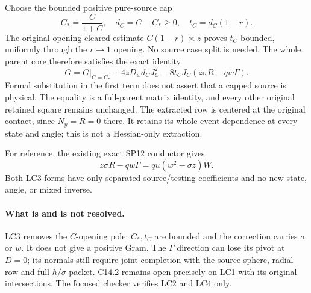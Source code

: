 Choose the bounded positive pure-source cap
\[
 C_*=\frac C{1+C},\quad d_C=C-C_*\ge0,
 \quad t_C=d_C(1-r).
\]
The original opening-cleared estimate $C(1-r)\asymp z$ proves
$t_C$ bounded, uniformly through the $r\to1$ opening.  No source
case split is needed.  The whole parent core therefore satisfies
the exact identity
\[
 \boxed{\quad
 G=G\big|_{C=C_*}+4zD_wd_CJ_C^2
              -8t_CJ_C(z\sigma R-qw\Gamma).
 \quad}                                                       \tag{LC3}
\]
Formal substitution in the first term does not assert that a capped
source is physical.  The equality is a full-parent matrix identity,
and every other original retained square remains unchanged.
The extracted row is centered at the original contact, since
$N_y=R=0$ there.  It retains its whole event dependence at every
state and angle; this is not a Hessian-only extraction.

For reference, the existing exact SP12 conductor gives
\[
 z\sigma R-qw\Gamma=qu(w^2-\sigma z)W.             \tag{LC4}
\]
Both LC3 forms have only separated source/testing coefficients and
no new state, angle, or mixed inverse.

\paragraph{What is and is not resolved.}
LC3 removes the $C$-opening pole: $C_*,t_C$ are bounded and the
correction carries $\sigma$ or $w$. It does not give a positive Gram.
The $\Gamma$ direction can lose its pivot at $D=0$; its normals still
require joint completion with the source sphere, radial row and full
$h/\sigma$ packet. C14.2 remains open precisely on LC1 with its original
intersections. The focused checker verifies LC2 and LC4 only.
